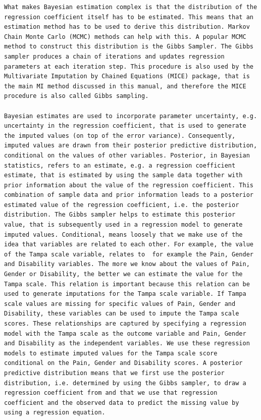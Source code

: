 \documentclass[]{book}
\theoremstyle{definition}
\theoremstyle{definition}
\theoremstyle{definition}
\theoremstyle{remark}
\begin{document}
\begin{verbatim}
What makes Bayesian estimation complex is that the distribution of the regression coefficient itself has to be estimated. This means that an estimation method has to be used to derive this distribution. Markov Chain Monte Carlo (MCMC) methods can help with this. A popular MCMC method to construct this distribution is the Gibbs Sampler. The Gibbs sampler produces a chain of iterations and updates regression parameters at each iteration step. This procedure is also used by the Multivariate Imputation by Chained Equations (MICE) package, that is the main MI method discussed in this manual, and therefore the MICE procedure is also called Gibbs sampling.

Bayesian estimates are used to incorporate parameter uncertainty, e.g. uncertainty in the regression coefficient, that is used to generate the imputed values (on top of the error variance). Consequently, imputed values are drawn from their posterior predictive distribution, conditional on the values of other variables. Posterior, in Bayesian statistics, refers to an estimate, e.g. a regression coefficient estimate, that is estimated by using the sample data together with prior information about the value of the regression coefficient. This combination of sample data and prior information leads to a posterior estimated value of the regression coefficient, i.e. the posterior distribution. The Gibbs sampler helps to estimate this posterior value, that is subsequently used in a regression model to generate imputed values. Conditional, means loosely that we make use of the idea that variables are related to each other. For example, the value of the Tampa scale variable, relates to  for example the Pain, Gender and Disability variables. The more we know about the values of Pain, Gender or Disability, the better we can estimate the value for the Tampa scale. This relation is important because this relation can be used to generate imputations for the Tampa scale variable. If Tampa scale values are missing for specific values of Pain, Gender and Disability, these variables can be used to impute the Tampa scale scores. These relationships are captured by specifying a regression model with the Tampa scale as the outcome variable and Pain, Gender and Disability as the independent variables. We use these regression models to estimate imputed values for the Tampa scale score conditional on the Pain, Gender and Disability scores. A posterior predictive distribution means that we first use the posterior distribution, i.e. determined by using the Gibbs sampler, to draw a regression coefficient from and that we use that regression coefficient and the observed data to predict the missing value by using a regression equation. 
\end{verbatim}
\end{document}

